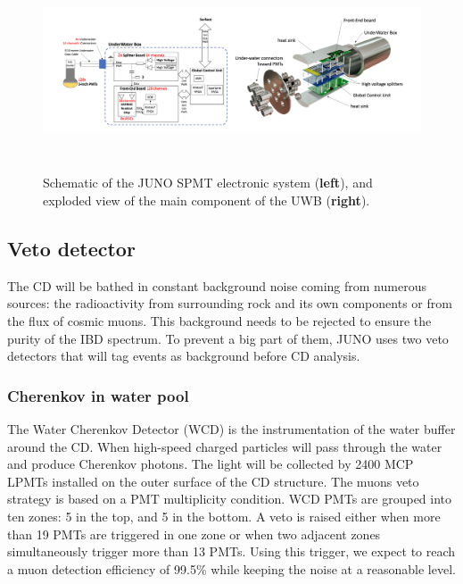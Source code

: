 \documentclass[../main.tex]{subfiles}
\begin{document}
\begin{figure}[ht]
  \centering
  \includegraphics[height=6cm]{images/juno/SPMT_readout.png}
  \caption{Schematic of the JUNO SPMT electronic system (\textbf{left}), and exploded view of the main component of the UWB (\textbf{right}).}
  \label{fig:juno:spmt_elec}
\end{figure}

\subsection{Veto detector}

The CD will be bathed in constant background noise coming from numerous sources: the radioactivity from surrounding rock and its own components or from the flux of cosmic muons. This background needs to be rejected to ensure the purity of the IBD spectrum. To prevent a big part of them, JUNO uses two veto detectors that will tag events as background before CD analysis.

\subsubsection{Cherenkov in water pool}

The Water Cherenkov Detector (WCD) is the instrumentation of the water buffer around the CD. When high-speed charged particles will pass through the water and produce Cherenkov photons. The light will be collected by 2400 MCP LPMTs installed on the outer surface of the CD structure. The muons veto strategy is based on a PMT multiplicity condition. WCD PMTs are grouped into ten zones: 5 in the top, and 5 in the bottom. A veto is raised either when more than 19 PMTs are triggered in one zone or when two adjacent zones simultaneously trigger more than 13 PMTs. Using this trigger, we expect to reach a muon detection efficiency of 99.5\% while keeping the noise at a reasonable level.
\end{document}
